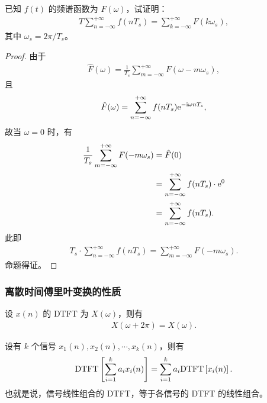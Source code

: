 \begin{exercise}
    已知 $f(t)$ 的频谱函数为 $F(\omega)$，试证明：
    \begin{align*}
        T \sum_{n = -\infty}^{+\infty}f(nT_s) = \sum_{k = -\infty}^{+\infty}F(k\omega_s),
    \end{align*}
    其中 $\omega_s = 2\pi / T_s$。
\end{exercise}

\begin{proof}
    由于
    \begin{align*}
        \hat{F}(\omega) = \frac{1}{T_s}\sum_{m = -\infty}^{+\infty}F(\omega - m\omega_s),
    \end{align*}
    且
    \begin{align*}
        \hat{F}(\omega) = \sum_{n = -\infty}^{+\infty}f(nT_s)\mathrm{e}^{-\mathrm{i}\omega nT_s},
    \end{align*}
    故当 $\omega = 0$ 时，有
    \begin{align*}
        \frac{1}{T_s}\sum_{m = -\infty}^{+\infty}F(-m\omega_s) & = \hat{F}(0) \\
        & = \sum_{n = -\infty}^{+\infty}f(nT_s) \cdot \mathrm{e}^{0} \\
        & = \sum_{n = -\infty}^{+\infty}f(nT_s).
    \end{align*}
    此即
    \begin{align*}
        T_s \cdot \sum_{n = -\infty}^{+\infty}f(nT_s) = \sum_{m = -\infty}^{+\infty}F(-m\omega_s).
    \end{align*}
    命题得证。
\end{proof}

\subsubsection{离散时间傅里叶变换的性质}

\begin{property}
    设 $x(n)$ 的 DTFT 为 $X(\omega)$，则有
    \begin{align*}
        X(\omega + 2\pi) = X(\omega).
    \end{align*}
\end{property}

\begin{property}
    设有 $k$ 个信号 $x_1(n), x_2(n), \cdots, x_k(n)$，则有
    \begin{align*}
        \mathrm{DTFT}\left[\sum_{i = 1}^{k}a_i x_i(n)\right] = \sum_{i = 1}^{k}a_i \mathrm{DTFT}\left[x_i(n)\right].
    \end{align*}
    也就是说，信号线性组合的 DTFT，等于各信号的 DTFT 的线性组合。
\end{property}

